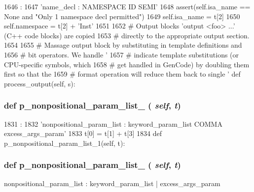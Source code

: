 \begin{DoxyCode}
1646                             :
1647         'name_decl : NAMESPACE ID SEMI'
1648         assert(self.isa_name == None and "Only 1 namespace decl permitted")
1649         self.isa_name = t[2]
1650         self.namespace = t[2] + 'Inst'
1651 
1652     # Output blocks 'output <foo> {{...}}' (C++ code blocks) are copied
1653     # directly to the appropriate output section.
1654 
1655     # Massage output block by substituting in template definitions and
1656     # bit operators.  We handle '%
1657     # indicate template substitutions (or CPU-specific symbols, which
1658     # get handled in GenCode) by doubling them first so that the
1659     # format operation will reduce them back to single '%
    def process_output(self, s):
\end{DoxyCode}
\hypertarget{classisa__parser_1_1ISAParser_a3e0f5ac33bb0d8d44ef032510f44565d}{
\subsubsection[{p\_\-nonpositional\_\-param\_\-list\_\-0}]{\setlength{\rightskip}{0pt plus 5cm}def p\_\-nonpositional\_\-param\_\-list\_ ( {\em self}, \/   {\em t})}}
\label{classisa__parser_1_1ISAParser_a3e0f5ac33bb0d8d44ef032510f44565d}



\begin{DoxyCode}
1831                                              :
1832         'nonpositional_param_list : keyword_param_list COMMA excess_args_param'
1833         t[0] = t[1] + t[3]
1834 
    def p_nonpositional_param_list_1(self, t):
\end{DoxyCode}
\hypertarget{classisa__parser_1_1ISAParser_aded99c866ceb14d316e5a5bb6fab0338}{
\subsubsection[{p\_\-nonpositional\_\-param\_\-list\_\-1}]{\setlength{\rightskip}{0pt plus 5cm}def p\_\-nonpositional\_\-param\_\-list\_ ( {\em self}, \/   {\em t})}}
\label{classisa__parser_1_1ISAParser_aded99c866ceb14d316e5a5bb6fab0338}
\begin{DoxyVerb}nonpositional_param_list : keyword_param_list
                    | excess_args_param\end{DoxyVerb}
 



